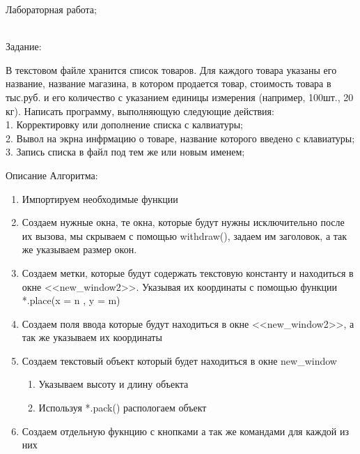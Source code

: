 \documentclass[a4paper]{article}
\begin{document}
\newpage
Лабораторная работа;
\\
    \begin{lab1}
        \begin{center}\underline{\hspace{6cm}}\\
            Задание:\\
        \end{center}
        В текстовом файле хранится список товаров. Для каждого товара указаны его название, название магазина, в котором продается товар, стоимость товара в тыс.руб. и его количество с указанием единицы измерения (например, 100шт., 20 кг). Написать программу, выполняющую следующие действия:\\
        1. Корректировку или дополнение списка с калвиатуры;\\
            2. Вывол на экрна инфрмацию о товаре, название которого введено с клавиатуры;\\
            3. Запись списка в файл под тем же или новым именем;\\
    \begin{algoritm}
        Описание Алгоритма:
        \small\begin{enumerate}
            \item 
                Импортируем необходимые функции
            \item 
                Создаем нужные окна, те окна, которые будут нужны исключительно после их вызова, мы скрываем с помощью withdraw(), задаем им заголовок, а так же указываем размер окон.
            \item
                Создаем метки, которые будут содержать текстовую константу и находиться в окне <<new\_window2>>. Указывая их координаты с помощью функции *.place(x = n , y = m)
            \item
                Создаем поля ввода которые будут находиться в окне <<new\_window2>>, а так же указываем их координаты
            \item
                Создаем текстовый объект который будет находиться в окне new\_window
            \begin{enumerate}
                \item 
                    Указываем высоту и длину объекта
                \item 
                    Используя *.pack() распологаем объект
            \end{enumerate}
            \item 
                Создаем отдельную фукнцию с кнопками а так же командами для каждой из них

\end{enumerate}
\end{algoritm}
\end{lab1}
\end{document}

